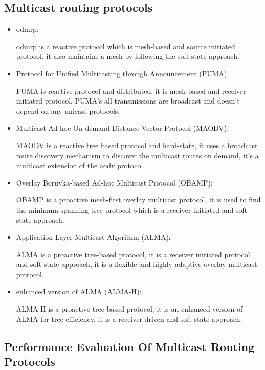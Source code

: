 \subsection{Multicast routing protocols}
\begin{itemize}[itemsep=1pt, topsep=5pt]
\item \acrfull{odmrp}:

\acrshort{odmrp} is a reactive protocol which is mesh-based and source initiated protocol, it also maintains a mesh by following the soft-state approach.

\item Protocol for Unified Multicasting through Announcement (PUMA):

PUMA is reactive protocol and distributed, it is mesh-based and receiver initiated protocol, PUMA’s all transmissions are broadcast and doesn’t depend on any unicast protocols.

\item Multicast Ad-hoc On demand Distance Vector Protocol (MAODV):

MAODV is a reactive tree based protocol and hard-state, it uses a broadcast route discovery mechanism to discover the multicast routes on demand, it’s a multicast extension of the \acrshort{aodv} protocol.\cite{chow2008multiple}

\item Overlay Boruvka-based Ad-hoc Multicast Protocol (OBAMP):

OBAMP is a proactive mesh-first overlay multicast protocol, it is used to find the minimum spanning tree protocol which is a receiver initiated and soft-state approach.

\item Application Layer Multicast Algorithm (ALMA):

ALMA is a proactive tree-based protocol, it is a receiver initiated protocol and soft-state approach, it is a flexible and highly adaptive overlay multicast protocol.

\item enhanced version of ALMA (ALMA-H):

ALMA-H is a proactive tree-based protocol, it is an enhanced version of ALMA for tree efficiency, it is a receiver driven and soft-state approach.


\end{itemize}

\subsection{Performance Evaluation Of Multicast Routing Protocols}

